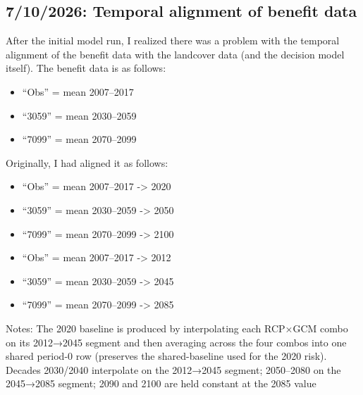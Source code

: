 \documentclass[
  letterpaper,
  DIV=11,
  numbers=noendperiod]{scrartcl}
\providecommand{\tightlist}{%
  \setlength{\itemsep}{0pt}\setlength{\parskip}{0pt}}
\begin{document}
\newpage{}

\subsection{7/10/2026: Temporal alignment of benefit
data}\label{temporal-alignment-of-benefit-data}

After the initial model run, I realized there was a problem with the
temporal alignment of the benefit data with the landcover data (and the
decision model itself). The benefit data is as follows:

\begin{itemize}
\tightlist
\item
  ``Obs'' = mean 2007--2017
\item
  ``3059'' = mean 2030--2059
\item
  ``7099'' = mean 2070--2099
\end{itemize}

Originally, I had aligned it as follows:

\begin{itemize}
\tightlist
\item
  ``Obs'' = mean 2007--2017 -\textgreater{} 2020
\item
  ``3059'' = mean 2030--2059 -\textgreater{} 2050
\item
  ``7099'' = mean 2070--2099 -\textgreater{} 2100
\end{itemize}

\begin{description}
\tightlist
\item[After talking with Owen, I updated the alignment to use window
midpoints]
\end{description}

\begin{itemize}
\tightlist
\item
  ``Obs'' = mean 2007--2017 -\textgreater{} 2012
\item
  ``3059'' = mean 2030--2059 -\textgreater{} 2045
\item
  ``7099'' = mean 2070--2099 -\textgreater{} 2085
\end{itemize}

Notes: The 2020 baseline is produced by interpolating each RCP×GCM combo
on its 2012→2045 segment and then averaging across the four combos into
one shared period-0 row (preserves the shared-baseline used for the 2020
risk). Decades 2030/2040 interpolate on the 2012→2045 segment;
2050--2080 on the 2045→2085 segment; 2090 and 2100 are held constant at
the 2085 value
\end{document}
